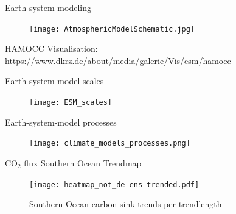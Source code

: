 \documentclass[aspectratio=169]{beamer}
\begin{document}
\appendix

\begin{frame}{Earth-system-modeling}

\begin{figure}[h]
	\texttt{[image: AtmosphericModelSchematic.jpg]} %
	\label{fig:heatmap}
\end{figure}

HAMOCC Visualisation: \url{https://www.dkrz.de/about/media/galerie/Vis/esm/hamocc}

\end{frame}



\begin{frame}{Earth-system-model scales}

\begin{figure}[h]
	\texttt{[image: ESM\_scales]} %
	\label{fig:heatmap}
\end{figure}

\end{frame}

\begin{frame}{Earth-system-model processes}

\begin{figure}[h]
	\texttt{[image: climate\_models\_processes.png]} %
	\label{fig:heatmap}
\end{figure}

\end{frame}

		

\begin{frame}{CO$_2$ flux Southern Ocean Trendmap}
\begin{figure}[h]
	\texttt{[image: heatmap\_not\_de-ens-trended.pdf]} %
\caption{Southern Ocean carbon sink trends per trendlength}
	\label{fig:heatmap}
\end{figure}
\end{frame}
\end{document}
